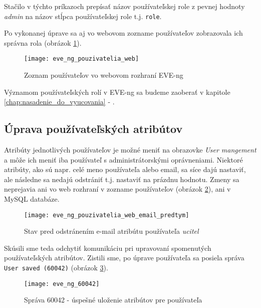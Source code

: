 Stačilo v týchto príkazoch prepísať názov používateľskej role z pevnej hodnoty \emph{admin} na názov stĺpca používateľskej role t.j. \texttt{role}.

Po vykonanej úprave sa aj vo webovom zozname používateľov zobrazovala ich správna rola (obrázok \ref{obr:eve_ng_pouzivatelia_web}).

\begin{figure}
    \centering
    \texttt{[image: eve\_ng\_pouzivatelia\_web]}
    \caption{Zoznam používateľov vo webovom rozhraní EVE-ng}
    \label{obr:eve_ng_pouzivatelia_web}
\end{figure}

Významom používateľských rolí v EVE-ng sa budeme zaoberať v kapitole \ref{chap:nasadenie_do_vyucovania} - .




\subsection{Úprava používateľských atribútov}

Atribúty jednotlivých používateľov je možné meniť na obrazovke \emph{User mangement} a môže ich meniť iba používateľ s administrátorskými oprávneniami. Niektoré atribúty, ako sú napr. celé meno používateľa alebo email, sa síce dajú nastaviť, ale následne sa nedajú odstrániť t.j. nastaviť na prázdnu hodnotu. Zmeny sa neprejavia ani vo web rozhraní v zozname používateľov (obrázok \ref{obr:eve_ng_pouzivatelia_web_email_predtym}), ani v MySQL databáze.

\begin{figure}
    \centering
    \texttt{[image: eve\_ng\_pouzivatelia\_web\_email\_predtym]}
    \caption{Stav pred odstránením e-mail atribútu používateľa \emph{ucitel}}
    \label{obr:eve_ng_pouzivatelia_web_email_predtym}
\end{figure}

Skúsili sme teda odchytiť komunikáciu pri upravovaní spomenutých používateľských atribútov. Zistili sme, po úprave používateľa sa posiela správa \texttt{User saved (60042)} (obrázok \ref{obr:eve_ng_60042}).

\begin{figure}
    \centering
    \texttt{[image: eve\_ng\_60042]}
    \caption{Správa 60042 - úspešné uloženie atribútov pre používateľa}
    \label{obr:eve_ng_60042}
\end{figure}

